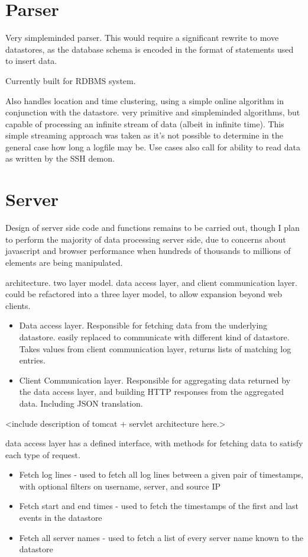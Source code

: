 \section{Parser}

Very simpleminded parser. This would require a significant rewrite to move datastores, as the database schema is encoded in the format of statements used to insert data. 

Currently built for RDBMS system.

Also handles location and time clustering, using a simple online algorithm in conjunction with the datastore. very primitive and simpleminded algorithms, but capable of processing an infinite stream of data (albeit in infinite time). This simple streaming approach was taken as it's not possible to determine in the general case how long a logfile may be. Use cases also call for ability to read data as written by the SSH demon. 

\section{Server}

Design of server side code and functions remains to be carried out, though I plan to perform the majority of data processing server side, due to concerns about javascript and browser performance when hundreds of thousands to millions of elements are being manipulated. 

architecture. two layer model. data access layer, and client communication layer. 
could be refactored into a three layer model, to allow expansion beyond web clients. 
\begin{itemize}
\item{Data access layer. Responsible for fetching data from the underlying datastore. easily replaced to communicate with different kind of datastore. Takes values from client communication layer, returns lists of matching log entries.}
\item{Client Communication layer. Responsible for aggregating data returned by the data access layer, and building HTTP responses from the aggregated data. Including JSON translation.}
\end{itemize}
<include description of tomcat + servlet architecture here.>

data access layer has a defined interface, with methods for fetching data to satisfy each type of request.
\begin{itemize}
\item{Fetch log lines - used to fetch all log lines between a given pair of timestamps, with optional filters on username, server, and source IP}
\item{Fetch start and end times - used to fetch the timestamps of the first and last events in the datastore}
\item{Fetch all server names - used to fetch a list of every server name known to the datastore}
\end{itemize}

